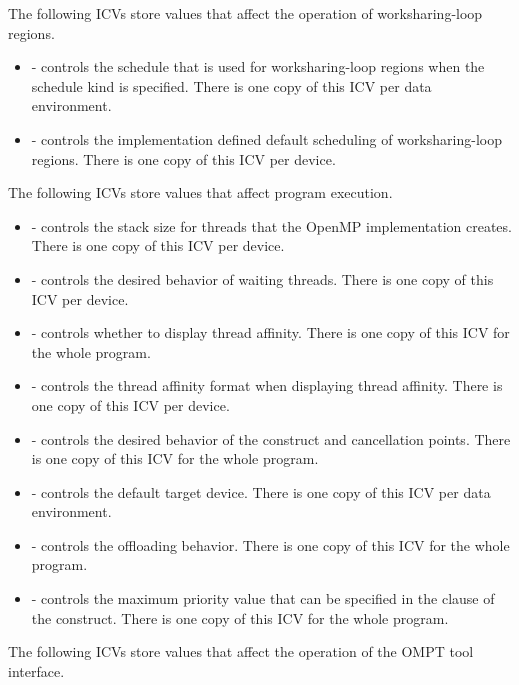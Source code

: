 The following ICVs store values that affect the operation of worksharing-loop regions.

\begin{itemize}
\item {} - controls the schedule that is used for 
      worksharing-loop regions when the  schedule kind is
      specified. There is one copy of this ICV per data environment.
\item {} - controls the implementation defined default scheduling 
      of worksharing-loop regions. There is one copy of this ICV per device.
\end{itemize}

The following ICVs store values that affect program execution.

\begin{itemize}
\item {} - controls the stack size for threads that the OpenMP 
      implementation creates. There is one copy of this ICV per device.
\item {} - controls the desired behavior of waiting threads. 
      There is one copy of this ICV per device.
\item {} - controls whether to display thread affinity. 
      There is one copy of this ICV for the whole program.
\item {} - controls the thread affinity format when displaying 
      thread affinity. There is one copy of this ICV per device.
\item {} - controls the desired behavior of the  construct 
      and cancellation points. There is one copy of this ICV for the whole program.
\item {} - controls the default target device. There is one copy 
      of this ICV per data environment.
\item {} - controls the offloading behavior. There is one copy 
      of this ICV for the whole program.
\item {} - controls the maximum priority value that can be 
      specified in the  clause of the  construct. There is 
      one copy of this ICV for the whole program.
\end{itemize}

The following ICVs store values that affect the operation of the OMPT tool interface.

